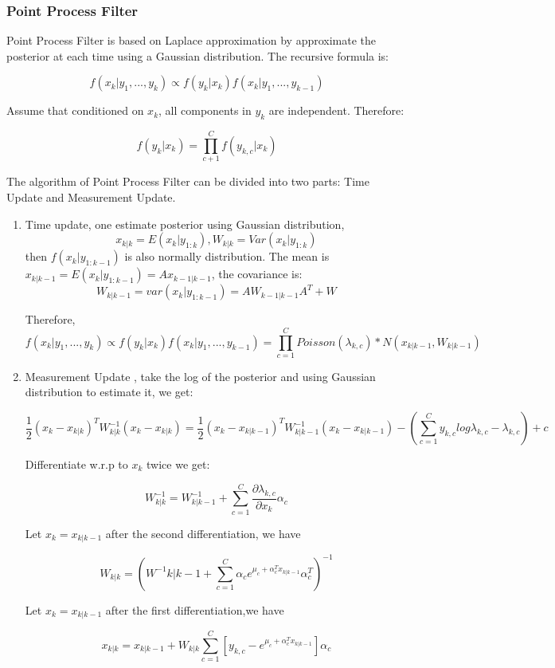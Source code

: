 \documentclass[12pt,letterpaper]{article}
\begin{document}
\subsubsection{Point Process Filter}
Point Process Filter is based on Laplace approximation by approximate the posterior at each time using a Gaussian distribution. The recursive formula is:

$$f(x_k|y_1,...,y_k) \propto f(y_k|x_k) f(x_k| y_1,...,y_{k-1}) $$

Assume that conditioned on $x_k$, all components in $y_k$ are independent. Therefore:

$$f(y_k|x_k) = \prod_{c+1}^C {f(y_{k,c}|x_k)}$$

The algorithm of Point Process Filter can be divided into two parts: Time Update and Measurement Update.

\begin{enumerate}

\item Time update, one estimate posterior using Gaussian distribution, $$x_{k|k} = E(x_{k}|y_{1:k}),W_{k|k} = Var(x_k|y_{1:k})$$ then $f(x_k|y_{1:k-1})$ is also normally distribution. The mean is $x_{k|k-1}=E(x_k|y_{1:k-1})=A x_{k-1|k-1}$, the covariance is: 
$$W_{k|k-1} = var(x_k|y_{1:k-1})=A W_{k-1|k-1} A^T + W$$

Therefore, 
$$ f(x_k|y_1,...,y_k) \propto f(y_k|x_k) f(x_k| y_1,...,y_{k-1}) = \prod_{c=1}^C{Poisson(\lambda_{k,c})}* N(x_{k|k-1},W_{k|k-1}) $$

\item Measurement Update , take the log of the posterior and using Gaussian distribution to estimate it, we get:

$$\frac{1}{2} (x_k-x_{k|k})^T W^{-1}_{k|k} (x_k-x_{k|k}) = \frac{1}{2}  (x_k-x_{k|k-1})^T W^{-1}_{k|k-1} (x_k-x_{k|k-1}) - (\sum_{c=1}^C {y_{k,c} log \lambda_{k,c} - \lambda_{k,c}}) + c $$

Differentiate w.r.p to $x_k$ twice we get:

$$W^{-1}_{k|k} = W^{-1}_{k|k-1} + \sum_{c=1}^C{\frac{\partial \lambda_{k,c}}{\partial x_k} \alpha_c} $$

Let $x_k = x_{k|k-1}$ after the second differentiation, we have

$$W_{k|k} = (W^{-1}{k|k-1} + \sum_{c=1}^{C}{\alpha_c e^{\mu_c + \alpha^T_c x_{k|k-1}} \alpha_c^T})^{-1} $$

Let $x_k = x_{k|k-1}$ after the first differentiation,we have

$$x_{k|k} = x_{k|k-1} + W_{k|k} \sum_{c=1}^C [y_{k,c} - e^{\mu_c + \alpha^T_c x_{k|k-1}}] \alpha_c $$

\end{enumerate}
\end{document}
